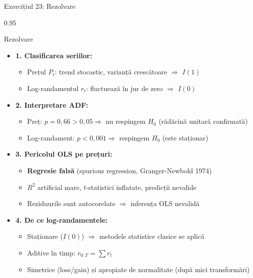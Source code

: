 \documentclass[9pt, aspectratio=169, t]{beamer}
\begin{document}
\begin{frame}[shrink=25]{Exercițiul 23: Rezolvare}
\begin{cminipage}{0.95\textwidth}
\begin{exampleblock}{Rezolvare}
\begin{itemize}\setlength{\itemsep}{0pt}
    \item \textbf{1. Clasificarea seriilor:}
    \begin{itemize}\setlength{\itemsep}{0pt}
        \item Prețul $P_t$: trend stocastic, varianță crescătoare $\Rightarrow$ \textbf{$I(1)$}
        \item Log-randamentul $r_t$: fluctuează în jur de zero $\Rightarrow$ \textbf{$I(0)$}
    \end{itemize}
    \item \textbf{2. Interpretare ADF:}
    \begin{itemize}\setlength{\itemsep}{0pt}
        \item Preț: $p = 0{,}66 > 0{,}05 \Rightarrow$ nu respingem $H_0$ (rădăcină unitară confirmată)
        \item Log-randament: $p < 0{,}001 \Rightarrow$ respingem $H_0$ (este staționar)
    \end{itemize}
    \item \textbf{3. Pericolul OLS pe prețuri:}
    \begin{itemize}\setlength{\itemsep}{0pt}
        \item \textbf{Regresie falsă} (spurious regression, Granger-Newbold 1974)
        \item $R^2$ artificial mare, $t$-statistici inflatate, predicții nevalide
        \item Reziduurile sunt autocorelate $\Rightarrow$ inferența OLS nevalidă
    \end{itemize}
    \item \textbf{4. De ce log-randamentele:}
    \begin{itemize}\setlength{\itemsep}{0pt}
        \item Staționare ($I(0)$) $\Rightarrow$ metodele statistice clasice se aplică
        \item Aditive în timp: $r_{0:T} = \sum r_t$
        \item Simetrice (loss/gain) și apropiate de normalitate (după mici transformări)
    \end{itemize}
\end{itemize}
\end{exampleblock}
\end{cminipage}
\end{frame}
\end{document}
